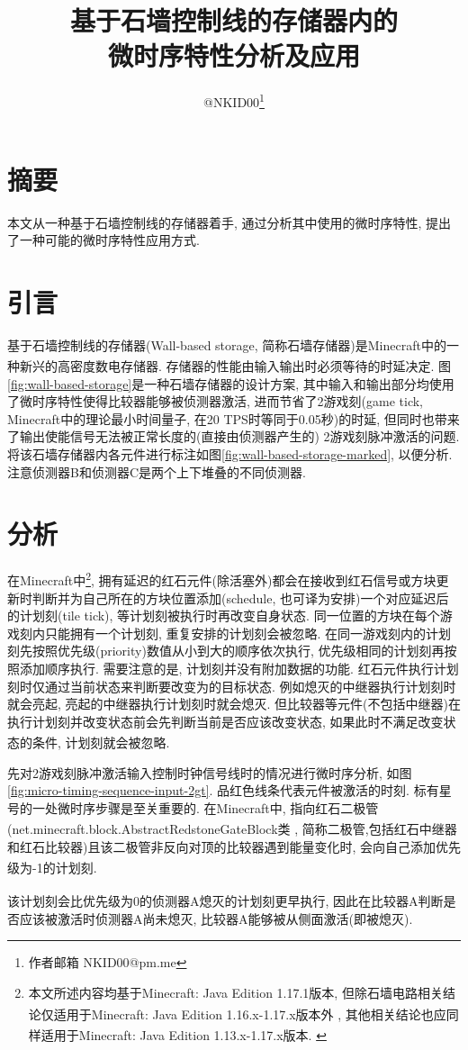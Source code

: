 \documentclass{article}
\title{基于石墙控制线的存储器内的\\微时序特性分析及应用}
\author{@NKID00\footnote{作者邮箱 NKID00@pm.me}}
\date{}
\newcommand*{\upcite}[1]{
    \textsuperscript{\cite{#1}}
}
\begin{document}
    \maketitle

    \section*{摘要}
    本文从一种基于石墙控制线的存储器着手, 通过分析其中使用的微时序特性, 提出了一种可能的微时序特性应用方式.

    \section{引言}
    基于石墙控制线的存储器(Wall-based storage, 简称石墙存储器)是Minecraft中的一种新兴的高密度数电存储器.\upcite{bib:wall-based-storage} 存储器的性能由输入输出时必须等待的时延决定. 图\ref{fig:wall-based-storage}是一种石墙存储器的设计方案, 其中输入和输出部分均使用了微时序特性使得比较器能够被侦测器激活, 进而节省了2游戏刻(game tick, Minecraft中的理论最小时间量子, 在20 TPS时等同于0.05秒)的时延, 但同时也带来了输出使能信号无法被正常长度的(直接由侦测器产生的) 2游戏刻脉冲激活的问题. 将该石墙存储器内各元件进行标注如图\ref{fig:wall-based-storage-marked}, 以便分析. 注意侦测器B和侦测器C是两个上下堆叠的不同侦测器.

    \section{分析}
    在Minecraft中\footnote{本文所述内容均基于Minecraft: Java Edition 1.17.1版本, 但除石墙电路相关结论仅适用于Minecraft: Java Edition 1.16.x-1.17.x版本外\upcite{bib:wall}, 其他相关结论也应同样适用于Minecraft: Java Edition 1.13.x-1.17.x版本.\upcite{bib:tile-tick}}, 拥有延迟的红石元件(除活塞外)都会在接收到红石信号或方块更新时判断并为自己所在的方块位置添加(schedule, 也可译为安排)一个对应延迟后的计划刻(tile tick), 等计划刻被执行时再改变自身状态. 同一位置的方块在每个游戏刻内只能拥有一个计划刻, 重复安排的计划刻会被忽略. 在同一游戏刻内的计划刻先按照优先级(priority)数值从小到大的顺序依次执行, 优先级相同的计划刻再按照添加顺序执行. 需要注意的是, 计划刻并没有附加数据的功能. 红石元件执行计划刻时仅通过当前状态来判断要改变为的目标状态. 例如熄灭的中继器执行计划刻时就会亮起, 亮起的中继器执行计划刻时就会熄灭. 但比较器等元件(不包括中继器)在执行计划刻并改变状态前会先判断当前是否应该改变状态, 如果此时不满足改变状态的条件, 计划刻就会被忽略.\upcite{bib:tile-tick-component}\upcite{bib:yarn}

    先对2游戏刻脉冲激活输入控制时钟信号线时的情况进行微时序分析, 如图\ref{fig:micro-timing-sequence-input-2gt}. 品红色线条代表元件被激活的时刻. 标有星号的一处微时序步骤是至关重要的. 在Minecraft中, 指向红石二极管(net.minecraft.block.AbstractRedstoneGateBlock类\upcite{bib:yarn}, 简称二极管,包括红石中继器和红石比较器)且该二极管非反向对顶的比较器遇到能量变化时, 会向自己添加优先级为-1的计划刻.\upcite{bib:tile-tick-component}\upcite{bib:yarn} 该计划刻会比优先级为0的侦测器A熄灭的计划刻更早执行, 因此在比较器A判断是否应该被激活时侦测器A尚未熄灭, 比较器A能够被从侧面激活(即被熄灭). 
\end{document}
